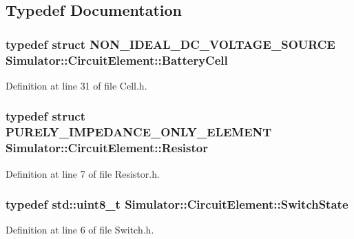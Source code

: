 \subsection{Typedef Documentation}
\hypertarget{namespace_simulator_1_1_circuit_element_a2f25ffbed70e35fab058b16f65277c9e}{}
\subsubsection[{Battery\+Cell}]{\setlength{\rightskip}{0pt plus 5cm}typedef struct {\bf N\+O\+N\+\_\+\+I\+D\+E\+A\+L\+\_\+\+D\+C\+\_\+\+V\+O\+L\+T\+A\+G\+E\+\_\+\+S\+O\+U\+R\+C\+E} {\bf Simulator\+::\+Circuit\+Element\+::\+Battery\+Cell}}\label{namespace_simulator_1_1_circuit_element_a2f25ffbed70e35fab058b16f65277c9e}


Definition at line 31 of file Cell.\+h.

\hypertarget{namespace_simulator_1_1_circuit_element_afde5004825abefab1d1e0bc721648463}{}
\subsubsection[{Resistor}]{\setlength{\rightskip}{0pt plus 5cm}typedef struct {\bf P\+U\+R\+E\+L\+Y\+\_\+\+I\+M\+P\+E\+D\+A\+N\+C\+E\+\_\+\+O\+N\+L\+Y\+\_\+\+E\+L\+E\+M\+E\+N\+T} {\bf Simulator\+::\+Circuit\+Element\+::\+Resistor}}\label{namespace_simulator_1_1_circuit_element_afde5004825abefab1d1e0bc721648463}


Definition at line 7 of file Resistor.\+h.

\hypertarget{namespace_simulator_1_1_circuit_element_a6774cddc1f4df8530170b06473f198d1}{}
\subsubsection[{Switch\+State}]{\setlength{\rightskip}{0pt plus 5cm}typedef std\+::uint8\+\_\+t {\bf Simulator\+::\+Circuit\+Element\+::\+Switch\+State}}\label{namespace_simulator_1_1_circuit_element_a6774cddc1f4df8530170b06473f198d1}


Definition at line 6 of file Switch.\+h.

